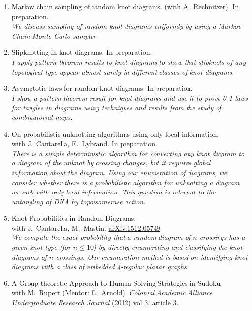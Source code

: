 \documentclass[letterpaper]{article}
\begin{document}
\begin{enumerate}
\item Markov chain sampling of random knot diagrams.
  (with A.\ Rechnitzer). In preparation.\\
  \textit{We discuss sampling of random knot diagrams uniformly by
    using a Markov Chain Monte Carlo sampler.}
\item Slipknotting in knot diagrams.
  In preparation.\\
  \textit{I apply pattern theorem results to knot diagrams to show
    that slipknots of any topological type appear almost surely in
    different classes of knot diagrams.}
\item Asymptotic laws for random knot diagrams.
  In preparation.\\
  \textit{I show a pattern theorem result for knot diagrams and use it
    to prove 0-1 laws for tangles in diagrams using techniques and
    results from the study of combinatorial maps.}
\item On probabilistic unknotting algorithms using only local information.\\
  with J.\ Cantarella, E.\ Lybrand. In preparation.\\
  \textit{There is a simple deterministic algorithm for converting any
    knot diagram to a diagram of the unknot by crossing changes, but
    it requires global information about the diagram. Using our
    enumeration of diagrams, we consider whether there is a
    probabilistic algorithm for unknotting a diagram as such with only
    local information. This question is relevant to the untangling of
    DNA by topoisomerase action.}
\item Knot Probabilities in Random Diagrams.\\
  with J.\ Cantarella, M.\ Mastin. \href{http://arxiv.org/abs/1512.05749}{arXiv:1512.05749}.\\
  \textit{We compute the exact probability that a random diagram of
    $n$ crossings has a given knot type (for $n \leq 10$) by directly
    enumerating and classifying the knot diagrams of $n$
    crossings. Our enumeration method is based on identifying knot
    diagrams with a class of embedded 4-regular planar graphs.}
\item A Group-theoretic Approach to Human Solving Strategies in
  Sudoku.\\
  with M.\ Rupert (Mentor: E.\ Arnold). \textit{Colonial Academic
    Alliance
    Undergraduate Research Journal} (2012) vol 3, article 3.\\

\end{enumerate}
\end{document}
